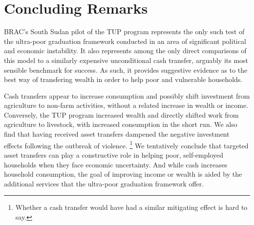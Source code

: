 \documentclass[12pt,article]{article}
\begin{document}
\newpage
\section{Concluding Remarks}
\label{sec-4}

BRAC's South Sudan pilot of the TUP program represents the only such test of the
ultra-poor graduation framework conducted in an area of significant political and
economic instability. It also represents among the only direct comparisons of this
model to a similarly expensive unconditional cash transfer, arguably its most
sensible benchmark for success. As such, it provides suggestive evidence as to the
best way of transfering wealth in order to help poor and vulnerable households.

Cash transfers appear to increase consumption and possibly shift investment from
agriculture to non-farm activities, without a related increase in wealth or income.
Conversely, the TUP program increased wealth and directly shifted work from
agriculture to livestock, with increased consumption in the short run. We also find
that having received asset transfers dampened the negative investment effects
following the outbreak of violence. \footnote{Whether a cash transfer would have had a
similar mitigating effect is hard to say.} We tentatively conclude that targeted
asset transfers can play a constructive role in helping poor, self-employed
households when they face economic uncertainty. And while cash increases household
consumption, the goal of improving income or wealth is aided by the additional
services that the ultra-poor graduation framework offer.
\end{document}
